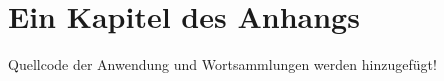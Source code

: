 \chapter{Ein Kapitel des Anhangs}
\label{cha:anhang}

Quellcode der Anwendung und Wortsammlungen werden hinzugefügt!


